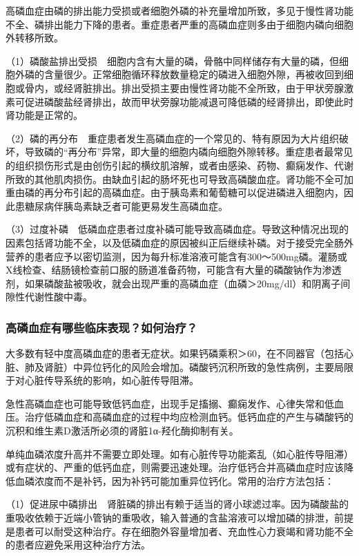 高磷血症由磷的排出能力受损或者细胞外磷的补充量增加所致，多见于慢性肾功能不全、磷排出能力下降的患者。重症患者严重的高磷血症则多由于细胞内磷向细胞外转移所致。

（1）磷酸盐排出受损　细胞内含有大量的磷，骨骼中同样储存有大量的磷，但细胞外磷的含量很少。正常细胞循环释放数量稳定的磷进入细胞外隙，再被收回到细胞或骨内，或经肾脏排出。排出受损主要由慢性肾功能不全所致，由于甲状旁腺激素可促进磷酸盐经肾排出，故而甲状旁腺功能减退可降低磷的经肾排出，即使此时肾功能是正常的。

（2）磷的再分布　重症患者发生高磷血症的一个常见的、特有原因为大片组织破坏，导致磷的“再分布”异常，即大量的细胞内磷向细胞外隙转移。重症患者最常见的组织损伤形式是由创伤引起的横纹肌溶解，或者由感染、药物、癫痫发作、代谢所致的其他肌肉损伤。由缺血引起的肠坏死也可导致高磷酸血症。肾功能不全可加重由磷的再分布引起的高磷血症。由于胰岛素和葡萄糖可以促进磷进入细胞内，因此患糖尿病伴胰岛素缺乏者可能更易发生高磷血症。

（3）过度补磷　低磷血症患者过度补磷可能导致高磷血症。导致这种情况出现的因素包括肾功能不全，以及低磷血症的原因被纠正后继续补磷。对于接受完全肠外营养的患者应予以密切监测，因为每升标准溶液可能含有300～500mg磷。灌肠或X线检查、结肠镜检查前口服的肠道准备药物，可能含有大量的磷酸钠作为渗透剂，如果磷酸盐被吸收，就会出现严重的高磷血症（血磷＞20mg/dl）和阴离子间隙性代谢性酸中毒。

\subsubsection{高磷血症有哪些临床表现？如何治疗？}

大多数有轻中度高磷血症的患者无症状。如果钙磷乘积＞60，在不同器官（包括心脏、肺及肾脏）中异位钙化的风险会增加。磷酸钙沉积所致的急性病例，主要局限于对心脏传导系统的影响，如心脏传导阻滞。

急性高磷血症也可能导致低钙血症，出现手足搐搦、癫痫发作、心律失常和低血压。治疗低磷血症和高磷血症的过程中均应检测血钙。低钙血症的产生与磷酸钙的沉积和维生素D激活所必须的肾脏1α-羟化酶抑制有关。

单纯血磷浓度升高并不需要立即处理。如有心脏传导功能紊乱（如心脏传导阻滞）或有症状的、严重的低钙血症，则需要迅速处理。治疗低钙合并高磷血症时应该降低血磷浓度而不是补钙，因为补钙可能加重异位钙化。常用的治疗方法包括：

（1）促进尿中磷排出　肾脏磷的排出有赖于适当的肾小球滤过率。因为磷酸盐的重吸收依赖于近端小管钠的重吸收，输入普通的含盐溶液可以增加磷的排泄，前提是患者可以耐受这种治疗。存在细胞外容量增加者、充血性心力衰竭和肾功能不全的患者应避免采用这种治疗方法。

